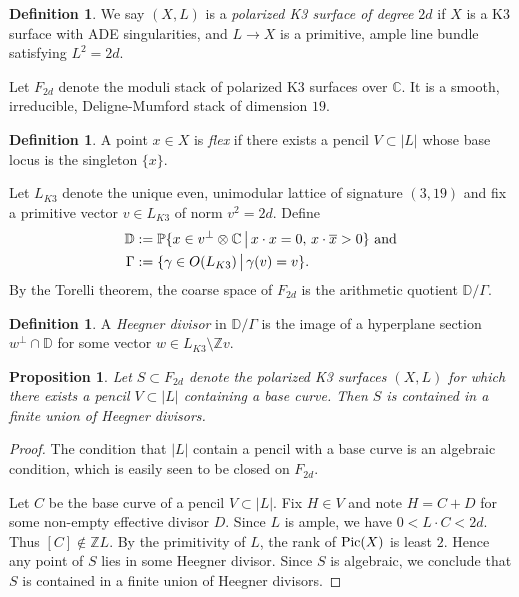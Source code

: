 \documentclass{amsart}
\newtheorem{proposition}[theorem]{Proposition}
\theoremstyle{definition}
\newtheorem{definition}[theorem]{Definition}
\newcommand{\Z}{\mathbb{Z}}
\newcommand{\C}{\mathbb{C}}
\begin{document}
\begin{definition} We say $(X,L)$ is a {\it polarized K3 surface of degree $2d$} if $X$
is a K3 surface with ADE singularities, and $L\to X$ is a primitive, ample line bundle
satisfying $L^2=2d$. 
\end{definition}

Let $F_{2d}$ denote the moduli stack of polarized K3 surfaces over $\C$.
It is a smooth, irreducible, Deligne-Mumford stack of dimension $19$.

\begin{definition} A point $x\in X$ is {\it flex} if there exists a pencil $V\subset |L|$ whose
base locus is the singleton $\{x\}$. \end{definition}

Let $L_{K3}$ denote the unique
even, unimodular lattice of signature $(3,19)$ and fix a primitive vector $v\in L_{K3}$
 of norm $v^2=2d$. Define
\begin{align*} \mathbb{D}&:=\mathbb{P}\{x\in v^\perp\otimes \C\,\big{|}\,x\cdot x=0,\,x\cdot \overline{x}>0\} \textrm{ and} \\ 
\Gamma&:=\{\gamma\in O(L_{K3})\,\big{|}\,\gamma(v)=v\}.\end{align*}
By the Torelli theorem, the coarse space of $F_{2d}$ 
is the arithmetic quotient $\mathbb{D}/\Gamma$. 

\begin{definition} A {\it Heegner divisor} in $\mathbb{D}/\Gamma$ is the image of a hyperplane section
$w^\perp\cap \mathbb{D}$ for some vector $w\in L_{K3}\setminus \Z v$. \end{definition}

\begin{proposition} Let $S\subset F_{2d}$ denote the
polarized K3 surfaces $(X,L)$ for which there exists a pencil
$V\subset |L|$ containing a base curve. Then $S$ is contained in a 
finite union of Heegner divisors.
\end{proposition}

\begin{proof} The condition that $|L|$ contain a pencil with a base curve
is an algebraic condition, which is easily seen to be closed on $F_{2d}$. 

Let $C$ be the base curve of a pencil $V\subset |L|$.
Fix $H\in V$ and note $H = C+D$ for some non-empty effective divisor $D$.
Since $L$ is ample, we have $0<L\cdot C<2d$.
Thus $[C]\notin \Z L$. By the primitivity of $L$, the rank of ${\rm Pic}(X)$
is least $2$. Hence any point of $S$ lies in some Heegner divisor. 
Since $S$ is algebraic, we conclude that
$S$ is contained in a finite union of Heegner divisors.
\end{proof}
\end{document}
